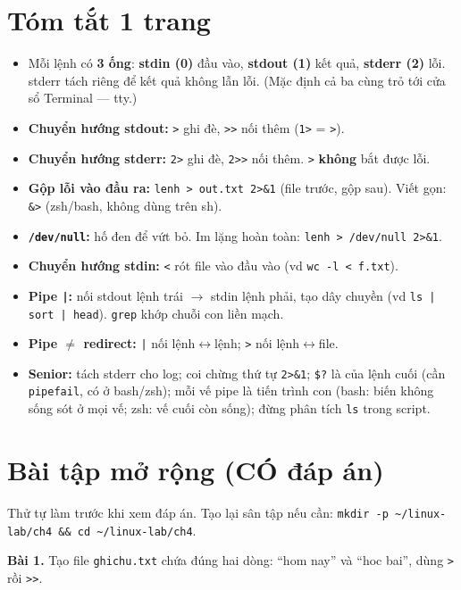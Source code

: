 \documentclass[12pt,a4paper]{article}
\newcommand{\cmd}[1]{\texttt{#1}}
\begin{document}
\section{Tóm tắt 1 trang}

\begin{itemize}[leftmargin=1.4em]
\item Mỗi lệnh có \textbf{3 ống}: \textbf{stdin (0)} đầu vào, \textbf{stdout (1)} kết quả, \textbf{stderr (2)} lỗi. stderr tách riêng để kết quả không lẫn lỗi. (Mặc định cả ba cùng trỏ tới cửa sổ Terminal --- tty.)
\item \textbf{Chuyển hướng stdout:} \cmd{>} ghi đè, \cmd{>>} nối thêm (\cmd{1>} = \cmd{>}).
\item \textbf{Chuyển hướng stderr:} \cmd{2>} ghi đè, \cmd{2>>} nối thêm. \cmd{>} \textbf{không} bắt được lỗi.
\item \textbf{Gộp lỗi vào đầu ra:} \cmd{lenh > out.txt 2>\&1} (file trước, gộp sau). Viết gọn: \cmd{\&>} (zsh/bash, không dùng trên sh).
\item \textbf{\cmd{/dev/null}:} hố đen để vứt bỏ. Im lặng hoàn toàn: \cmd{lenh > /dev/null 2>\&1}.
\item \textbf{Chuyển hướng stdin:} \cmd{<} rót file vào đầu vào (vd \cmd{wc -l < f.txt}).
\item \textbf{Pipe \cmd{|}:} nối stdout lệnh trái $\rightarrow$ stdin lệnh phải, tạo dây chuyền (vd \cmd{ls | sort | head}). \cmd{grep} khớp chuỗi con liền mạch.
\item \textbf{Pipe $\neq$ redirect:} \cmd{|} nối lệnh$\leftrightarrow$lệnh; \cmd{>} nối lệnh$\leftrightarrow$file.
\item \textbf{Senior:} tách stderr cho log; coi chừng thứ tự \cmd{2>\&1}; \cmd{\$?} là của lệnh cuối (cần \cmd{pipefail}, có ở bash/zsh); mỗi vế pipe là tiến trình con (bash: biến không sống sót ở mọi vế; zsh: vế cuối còn sống); đừng phân tích \cmd{ls} trong script.
\end{itemize}

\section{Bài tập mở rộng (CÓ đáp án)}

Thử tự làm trước khi xem đáp án. Tạo lại sân tập nếu cần: \cmd{mkdir -p \textasciitilde/linux-lab/ch4 \&\& cd \textasciitilde/linux-lab/ch4}.

\textbf{Bài 1.} Tạo file \cmd{ghichu.txt} chứa đúng hai dòng: ``hom nay'' và ``hoc bai'', dùng \cmd{>} rồi \cmd{>>}.
\end{document}
